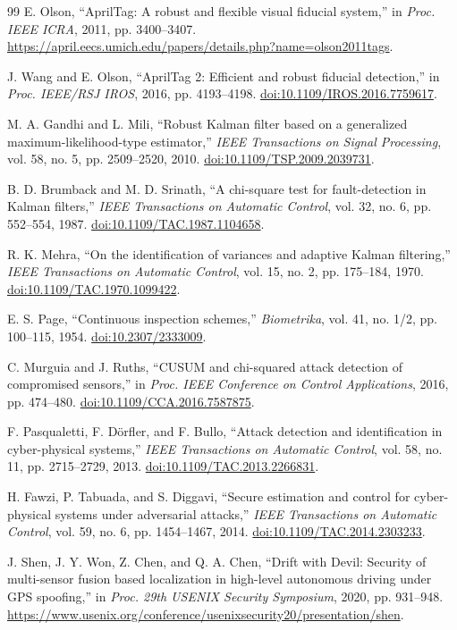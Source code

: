 \documentclass[11pt,oneside]{book}
\begin{document}
\begin{thebibliography}{99}
E. Olson, ``AprilTag: A robust and flexible visual fiducial system,''
in \emph{Proc. IEEE ICRA}, 2011, pp. 3400--3407.
\url{https://april.eecs.umich.edu/papers/details.php?name=olson2011tags}.

J. Wang and E. Olson, ``AprilTag 2: Efficient and robust fiducial detection,''
in \emph{Proc. IEEE/RSJ IROS}, 2016, pp. 4193--4198.
\href{https://doi.org/10.1109/IROS.2016.7759617}
{doi:10.1109/IROS.2016.7759617}.

M. A. Gandhi and L. Mili,
``Robust Kalman filter based on a generalized maximum-likelihood-type
estimator,'' \emph{IEEE Transactions on Signal Processing}, vol. 58, no. 5,
pp. 2509--2520, 2010.
\href{https://doi.org/10.1109/TSP.2009.2039731}
{doi:10.1109/TSP.2009.2039731}.

B. D. Brumback and M. D. Srinath,
``A chi-square test for fault-detection in Kalman filters,''
\emph{IEEE Transactions on Automatic Control}, vol. 32, no. 6,
pp. 552--554, 1987.
\href{https://doi.org/10.1109/TAC.1987.1104658}
{doi:10.1109/TAC.1987.1104658}.

R. K. Mehra, ``On the identification of variances and adaptive Kalman
filtering,'' \emph{IEEE Transactions on Automatic Control}, vol. 15, no. 2,
pp. 175--184, 1970.
\href{https://doi.org/10.1109/TAC.1970.1099422}
{doi:10.1109/TAC.1970.1099422}.

E. S. Page, ``Continuous inspection schemes,''
\emph{Biometrika}, vol. 41, no. 1/2, pp. 100--115, 1954.
\href{https://doi.org/10.2307/2333009}{doi:10.2307/2333009}.

C. Murguia and J. Ruths,
``CUSUM and chi-squared attack detection of compromised sensors,''
in \emph{Proc. IEEE Conference on Control Applications}, 2016, pp. 474--480.
\href{https://doi.org/10.1109/CCA.2016.7587875}
{doi:10.1109/CCA.2016.7587875}.

F. Pasqualetti, F. D\"orfler, and F. Bullo,
``Attack detection and identification in cyber-physical systems,''
\emph{IEEE Transactions on Automatic Control}, vol. 58, no. 11,
pp. 2715--2729, 2013.
\href{https://doi.org/10.1109/TAC.2013.2266831}
{doi:10.1109/TAC.2013.2266831}.

H. Fawzi, P. Tabuada, and S. Diggavi,
``Secure estimation and control for cyber-physical systems under adversarial
attacks,'' \emph{IEEE Transactions on Automatic Control}, vol. 59, no. 6,
pp. 1454--1467, 2014.
\href{https://doi.org/10.1109/TAC.2014.2303233}
{doi:10.1109/TAC.2014.2303233}.

J. Shen, J. Y. Won, Z. Chen, and Q. A. Chen,
``Drift with Devil: Security of multi-sensor fusion based localization in
high-level autonomous driving under GPS spoofing,''
in \emph{Proc. 29th USENIX Security Symposium}, 2020, pp. 931--948.
\url{https://www.usenix.org/conference/usenixsecurity20/presentation/shen}.

\end{thebibliography}
\end{document}
